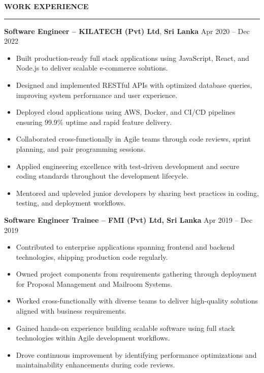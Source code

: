\documentclass[10pt,letterpaper]{article}
\begin{document}
\vspace{8pt}

\textbf{WORK EXPERIENCE}\\[-8pt]
\noindent\rule{\textwidth}{1pt}

\vspace{-2pt}

\textbf{Software Engineer -- KILATECH (Pvt) Ltd}, \textbf{Sri Lanka} \hfill Apr 2020 -- Dec 2022

\vspace{-1pt}

\begin{itemize}
\item Built production-ready full stack applications using JavaScript, React, and Node.js to deliver scalable e-commerce solutions.
\item Designed and implemented RESTful APIs with optimized database queries, improving system performance and user experience.
\item Deployed cloud applications using AWS, Docker, and CI/CD pipelines ensuring 99.9\% uptime and rapid feature delivery.
\item Collaborated cross-functionally in Agile teams through code reviews, sprint planning, and pair programming sessions.
\item Applied engineering excellence with test-driven development and secure coding standards throughout the development lifecycle.
\item Mentored and upleveled junior developers by sharing best practices in coding, testing, and deployment workflows.
\end{itemize}

\textbf{Software Engineer Trainee -- FMI (Pvt) Ltd, Sri Lanka} \hfill Apr 2019 -- Dec 2019

\vspace{-1pt}

\begin{itemize}
\item Contributed to enterprise applications spanning frontend and backend technologies, shipping production code regularly.
\item Owned project components from requirements gathering through deployment for Proposal Management and Mailroom Systems.
\item Worked cross-functionally with diverse teams to deliver high-quality solutions aligned with business requirements.
\item Gained hands-on experience building scalable software using full stack technologies within Agile development workflows.
\item Drove continuous improvement by identifying performance optimizations and maintainability enhancements during code reviews.
\end{itemize}
\end{document}
